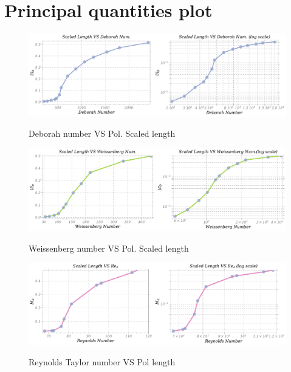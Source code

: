 \documentclass[]{article}
\begin{document}
\section{Principal quantities plot}
\begin{figure}
   \centering
       \includegraphics[width=1\textwidth]{DeborahNumber.pdf}
   \label{DeNum}
   \caption{Deborah number VS Pol. Scaled length}
\end{figure}
\begin{figure}
   \centering
       \includegraphics[width=1\textwidth]{WeissenbergNumber.pdf}
   \label{WeNum}
   \caption{Weissenberg number VS Pol. Scaled length}
\end{figure}
\begin{figure}
   \centering
       \includegraphics[width=1\textwidth]{ReynoldsTaylorNumber.pdf}
   \label{ReNum}
   \caption{Reynolds Taylor number VS Pol length}
\end{figure}
\end{document}
